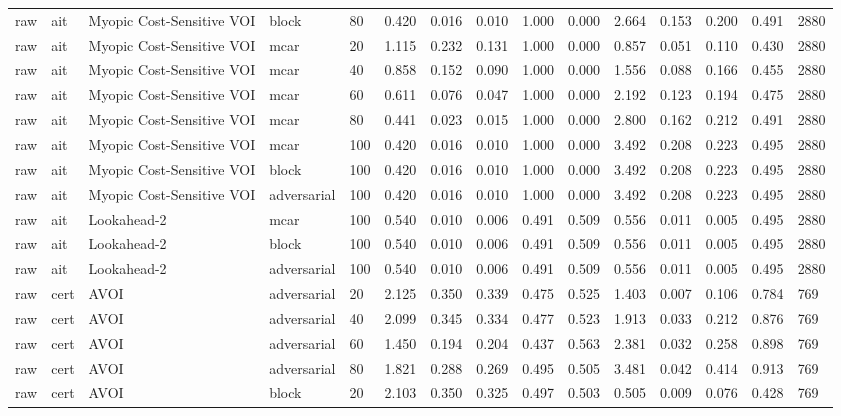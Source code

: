 \begin{table}[!ht]
{\begin{tabular}{lllllllllllllll}
raw & ait & Myopic Cost-Sensitive VOI & block & 80 & 0.420 & 0.016 & 0.010 & 1.000 & 0.000 & 2.664 & 0.153 & 0.200 & 0.491 & 2880 \\
raw & ait & Myopic Cost-Sensitive VOI & mcar & 20 & 1.115 & 0.232 & 0.131 & 1.000 & 0.000 & 0.857 & 0.051 & 0.110 & 0.430 & 2880 \\
raw & ait & Myopic Cost-Sensitive VOI & mcar & 40 & 0.858 & 0.152 & 0.090 & 1.000 & 0.000 & 1.556 & 0.088 & 0.166 & 0.455 & 2880 \\
raw & ait & Myopic Cost-Sensitive VOI & mcar & 60 & 0.611 & 0.076 & 0.047 & 1.000 & 0.000 & 2.192 & 0.123 & 0.194 & 0.475 & 2880 \\
raw & ait & Myopic Cost-Sensitive VOI & mcar & 80 & 0.441 & 0.023 & 0.015 & 1.000 & 0.000 & 2.800 & 0.162 & 0.212 & 0.491 & 2880 \\
raw & ait & Myopic Cost-Sensitive VOI & mcar & 100 & 0.420 & 0.016 & 0.010 & 1.000 & 0.000 & 3.492 & 0.208 & 0.223 & 0.495 & 2880 \\
raw & ait & Myopic Cost-Sensitive VOI & block & 100 & 0.420 & 0.016 & 0.010 & 1.000 & 0.000 & 3.492 & 0.208 & 0.223 & 0.495 & 2880 \\
raw & ait & Myopic Cost-Sensitive VOI & adversarial & 100 & 0.420 & 0.016 & 0.010 & 1.000 & 0.000 & 3.492 & 0.208 & 0.223 & 0.495 & 2880 \\
raw & ait & Lookahead-2 & mcar & 100 & 0.540 & 0.010 & 0.006 & 0.491 & 0.509 & 0.556 & 0.011 & 0.005 & 0.495 & 2880 \\
raw & ait & Lookahead-2 & block & 100 & 0.540 & 0.010 & 0.006 & 0.491 & 0.509 & 0.556 & 0.011 & 0.005 & 0.495 & 2880 \\
raw & ait & Lookahead-2 & adversarial & 100 & 0.540 & 0.010 & 0.006 & 0.491 & 0.509 & 0.556 & 0.011 & 0.005 & 0.495 & 2880 \\
raw & cert & AVOI & adversarial & 20 & 2.125 & 0.350 & 0.339 & 0.475 & 0.525 & 1.403 & 0.007 & 0.106 & 0.784 & 769 \\
raw & cert & AVOI & adversarial & 40 & 2.099 & 0.345 & 0.334 & 0.477 & 0.523 & 1.913 & 0.033 & 0.212 & 0.876 & 769 \\
raw & cert & AVOI & adversarial & 60 & 1.450 & 0.194 & 0.204 & 0.437 & 0.563 & 2.381 & 0.032 & 0.258 & 0.898 & 769 \\
raw & cert & AVOI & adversarial & 80 & 1.821 & 0.288 & 0.269 & 0.495 & 0.505 & 3.481 & 0.042 & 0.414 & 0.913 & 769 \\
raw & cert & AVOI & block & 20 & 2.103 & 0.350 & 0.325 & 0.497 & 0.503 & 0.505 & 0.009 & 0.076 & 0.428 & 769 \\

\end{tabular}}
\end{table}
